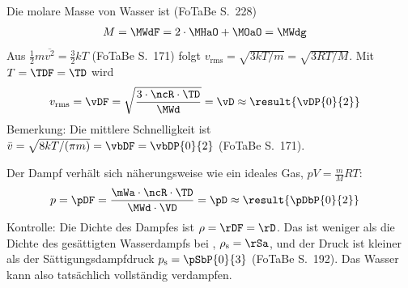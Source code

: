 \begin{abcliste}
\abc Die molare Masse von Wasser ist (FoTaBe S.~228)
\begin{align}
 M &= \MWdF = 2\cdot\MHaO + \MOaO = \MWdg
\end{align}
Aus $\frac{1}{2}m\overline{v^2} = \frac{3}{2}kT$ (FoTaBe S.~171) folgt $v_\text{rms} = \sqrt{3kT/m} = \sqrt{3RT/M}$. Mit $T = \TDF = \TD$ wird
\begin{align}
 v_\text{rms} &= \vDF = \sqrt{\frac{3\cdot\ncR\cdot\TD}{\MWd}} = \vD \approx \result{\vDP{0}{2}}
\end{align}
Bemerkung: Die mittlere Schnelligkeit ist $\bar v = \sqrt{8kT/(\pi m)} = \vbDF = \vbDP{0}{2}$ (FoTaBe S.~171).

\abc Der Dampf verhält sich näherungsweise wie ein ideales Gas, $pV = \frac{m}{M}RT$:
\begin{align}
 p &= \pDF = \frac{\mWa\cdot\ncR\cdot\TD}{\MWd\cdot\VD} = \pD \approx \result{\pDbP{0}{2}}
\end{align}
Kontrolle: Die Dichte des Dampfes ist $\rho = \rDF = \rD$. Das ist weniger als die Dichte des gesättigten Wasserdampfs bei \thDO, $\rho_\text{s} = \rSa$, und der Druck ist kleiner als der Sättigungsdampfdruck $p_\text{s} = \pSbP{0}{3}$ (FoTaBe S.~192). Das Wasser kann also tatsächlich vollständig verdampfen.
\end{abcliste}
